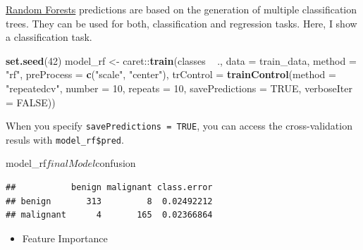 \documentclass[]{article}
\newenvironment{Shaded}{\begin{snugshade}}{\end{snugshade}}
\newcommand{\KeywordTok}[1]{\textcolor[rgb]{0.13,0.29,0.53}{\textbf{{#1}}}}
\newcommand{\DataTypeTok}[1]{\textcolor[rgb]{0.13,0.29,0.53}{{#1}}}
\newcommand{\DecValTok}[1]{\textcolor[rgb]{0.00,0.00,0.81}{{#1}}}
\newcommand{\StringTok}[1]{\textcolor[rgb]{0.31,0.60,0.02}{{#1}}}
\newcommand{\OtherTok}[1]{\textcolor[rgb]{0.56,0.35,0.01}{{#1}}}
\newcommand{\NormalTok}[1]{{#1}}
\providecommand{\tightlist}{%
  \setlength{\itemsep}{0pt}\setlength{\parskip}{0pt}}
\begin{document}
\href{https://www.stat.berkeley.edu/~breiman/RandomForests/cc_home.htm}{Random
Forests} predictions are based on the generation of multiple
classification trees. They can be used for both, classification and
regression tasks. Here, I show a classification task.

\begin{Shaded}
\begin{Highlighting}[]
\KeywordTok{set.seed}\NormalTok{(}\DecValTok{42}\NormalTok{)}
\NormalTok{model_rf <-}\StringTok{ }\NormalTok{caret::}\KeywordTok{train}\NormalTok{(classes ~}\StringTok{ }\NormalTok{.,}
                         \DataTypeTok{data =} \NormalTok{train_data,}
                         \DataTypeTok{method =} \StringTok{"rf"}\NormalTok{,}
                         \DataTypeTok{preProcess =} \KeywordTok{c}\NormalTok{(}\StringTok{"scale"}\NormalTok{, }\StringTok{"center"}\NormalTok{),}
                         \DataTypeTok{trControl =} \KeywordTok{trainControl}\NormalTok{(}\DataTypeTok{method =} \StringTok{"repeatedcv"}\NormalTok{, }
                                                  \DataTypeTok{number =} \DecValTok{10}\NormalTok{, }
                                                  \DataTypeTok{repeats =} \DecValTok{10}\NormalTok{, }
                                                  \DataTypeTok{savePredictions =} \OtherTok{TRUE}\NormalTok{, }
                                                  \DataTypeTok{verboseIter =} \OtherTok{FALSE}\NormalTok{))}
\end{Highlighting}
\end{Shaded}

When you specify \texttt{savePredictions\ =\ TRUE}, you can access the
cross-validation resuls with \texttt{model\_rf\$pred}.

\begin{Shaded}
\begin{Highlighting}[]
\NormalTok{model_rf$finalModel$confusion}
\end{Highlighting}
\end{Shaded}

\begin{verbatim}
##           benign malignant class.error
## benign       313         8  0.02492212
## malignant      4       165  0.02366864
\end{verbatim}

\begin{itemize}
\tightlist
\item
  Feature Importance
\end{itemize}
\end{document}

